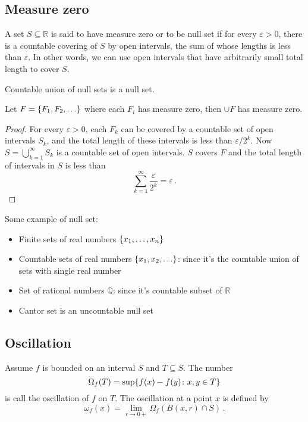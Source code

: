 \documentclass{article}
\newcommand{\R}{\mathbb R}
\newcommand{\Q}{\mathbb Q}
\DeclarePairedDelimiter\set{\lbrace}{\rbrace}
\begin{document}
\subsection{Measure zero}
\begin{definition}
    A set $ S \subseteq \R $ is said to have measure zero or to be null set if for every $ \varepsilon > 0 $, there is a countable covering of $ S $ by open intervals, the sum of whose lengths is less than $ \varepsilon $. In other words, we can use open intervals that have arbitrarily small total length to cover $ S $.
\end{definition}

Countable union of null sets is a null set.

\begin{theorem} \label{thm:countable-union-null}
    Let $ F = \set{F_1, F_2, \dots} $ where each $ F_i $ has measure zero, then $ \cup F $ has measure zero.
\end{theorem}

\begin{proof}
    For every $ \varepsilon > 0 $, each $ F_k $ can be covered by a countable set of open intervals $ S_k $, and the total length of these intervals is less than $ \varepsilon / 2^k $. Now $ S = \bigcup_{k=1}^\infty S_k $ is a countable set of open intervals. $ S $ covers $ F $ and the total length of intervals in $ S $ is less than
    \[ 
        \sum_{k=1}^{\infty} \dfrac{\varepsilon}{2^k} = \varepsilon \,.
    \]
\end{proof}

\begin{example} Some example of null set:
    \begin{itemize}
        \item Finite sets of real numbers $ \set{x_1, \dots, x_n} $
        \item Countable sets of real numbers $ \set{x_1, x_2, \dots} $: since it's the countable union of sets with single real number
        \item Set of rational numbers $ \Q $: since it's countable subset of $ \R $
        \item Cantor set is an uncountable null set
    \end{itemize}
\end{example}

\subsection{Oscillation}
\begin{definition}
    Assume $ f $ is bounded on an interval $ S $ and $ T \subseteq S $. The number
    \[ 
        \Omega_f (T) = \sup \set{f(x) - f(y) \colon x, y \in T}
    \]
    is call the oscillation of $ f $ on $ T $. The oscillation at a point $ x $ is defined by
    \[ 
        \omega_f (x) = \lim_{r \to 0+} \Omega_f (B(x, r) \cap S) \,.
    \]
\end{definition}
\end{document}
